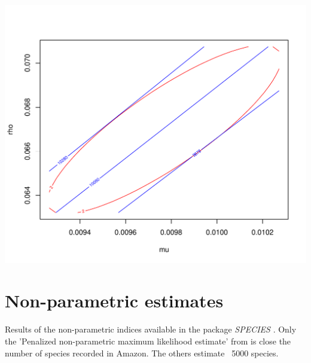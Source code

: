 \documentclass[12pt, A4]{article}\usepackage[]{graphicx}\usepackage[]{color}
\makeatletter
\def\maxwidth{ %
  \ifdim\Gin@nat@width>\linewidth
    \linewidth
  \else
    \Gin@nat@width
  \fi
}
\newenvironment{knitrout}{}{} %
\makeatother
\begin{document}
\begin{knitrout}
\color{fgcolor}

{\centering \includegraphics[width=\maxwidth]{figure/beta-binomial_likelihood_surface-1} 

}



\end{knitrout}

\section*{Non-parametric estimates}

Results of the non-parametric indices
available in the package \emph{SPECIES} \citep{SPECIES}.
Only the 'Penalized non-parametric maximum likelihood estimate'
from \citet{wang2005} is close the number of species recorded
in Amazon. The others estimate  ~5000 species.
\end{document}
